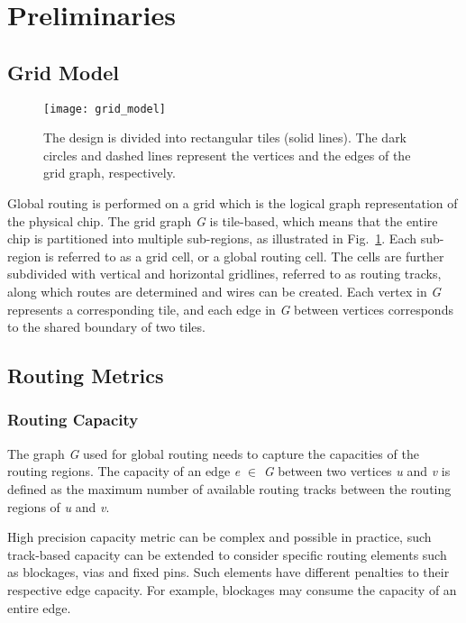 \section{Preliminaries}
\label{sec:prelim}

\subsection{Grid Model}
\label{subsec:grid model}

\begin{figure}[tb!]
    \centering
    \texttt{[image: grid\_model]}
	\caption{The design is divided into rectangular tiles (solid lines). The dark
		circles and dashed lines represent the vertices and the edges of the grid graph, respectively.}
	\label{fig:grid_model}
\end{figure}

Global routing is performed on a grid which is the logical graph representation of the physical chip. The grid graph \emph{G} is tile-based, which means that the entire chip is partitioned into multiple sub-regions, as illustrated in Fig.~\ref{fig:grid_model}. Each sub-region is referred to as a grid cell, or a global routing cell. The cells are further subdivided with vertical and horizontal gridlines, referred to as routing tracks, along which routes are determined and wires can be created. Each vertex in \emph{G} represents a corresponding tile, and each edge in \emph{G} between vertices corresponds to the shared boundary of two tiles.

\subsection{Routing Metrics}
\subsubsection{Routing Capacity}
The graph \emph{G} used for global routing needs to capture the capacities of the routing regions. The capacity of an edge \emph{e} $\in$ \emph{G} between two vertices \emph{u} and \emph{v} is defined as the maximum number of available routing tracks between the routing regions of \emph{u} and \emph{v}. 

High precision capacity metric can be complex and possible in practice, such track-based capacity can be extended to consider specific routing elements such as blockages, vias and fixed pins. Such elements have different penalties to their respective edge capacity. For example, blockages may consume the capacity of an entire edge. 

